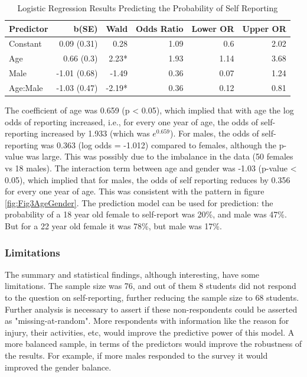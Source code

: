 \documentclass[11]{article}
\begin{document}
\begin{table}[H]
\centering
\begin{tabular}{lrrrrr}
  \hline
Predictor & b(SE) & Wald & Odds Ratio & Lower OR & Upper OR \\ 
  \hline
Constant & 0.09 (0.31) & 0.28 & 1.09 & 0.6 & 2.02 \\ 
  Age & 0.66 (0.3) & 2.23* & 1.93 & 1.14 & 3.68 \\ 
  Male & -1.01 (0.68) & -1.49 & 0.36 & 0.07 & 1.24 \\ 
  Age:Male & -1.03 (0.47) & -2.19* & 0.36 & 0.12 & 0.81 \\ 
   \hline
\end{tabular}
\caption{Logistic Regression Results Predicting the Probability of Self Reporting} 
\label{tab:Tab8}
\end{table}
The coefficient of age was 0.659 (p < 0.05), which implied that with age the log odds of reporting increased, i.e., for every one year of age, the odds of self-reporting increased by 1.933 (which was $e^{0.659}$). For males, the odds of self-reporting was 0.363 (log odds = -1.012) compared to females, although the p-value was large. This was possibly due to the imbalance in the data (50 females vs 18 males). The interaction term between age and gender was -1.03 (p-value < 0.05), which implied that for males, the odds of self reporting reduces by 0.356 for every one year of age. This was consistent with the pattern in figure \ref{fig:Fig3AgeGender}. The prediction model can be used for prediction: the probability of a 18 year old female to self-report was 20\%, and male was 47\%. But for a 22 year old female it was 78\%, but male was 17\%. 

\subsubsection*{Limitations}
The summary and statistical findings, although interesting, have some limitations. The sample size was 76, and out of them 8 students did not respond to the question on self-reporting, further reducing the sample size to 68 students. Further analysis is necessary to assert if these non-respondents could be asserted as "missing-at-random". More respondents with information like the reason for injury, their activities, etc, would improve the predictive power of this model. A more balanced sample, in terms of the predictors would improve the robustness of the results. For example, if more males responded to the survey it would improved the gender balance. 
\end{document}
